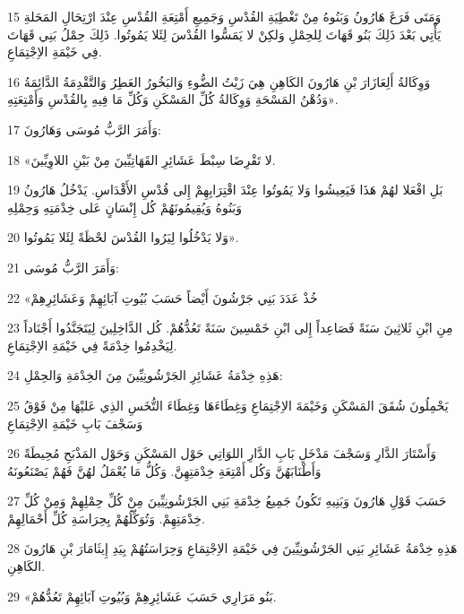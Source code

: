 \par 15 وَمَتَى فَرَغَ هَارُونُ وَبَنُوهُ مِنْ تَغْطِيَةِ القُدْسِ وَجَمِيعِ أَمْتِعَةِ القُدْسِ عِنْدَ ارْتِحَالِ المَحَلةِ يَأْتِي بَعْدَ ذَلِكَ بَنُو قَهَاتَ لِلحِمْلِ وَلكِنْ لا يَمَسُّوا القُدْسَ لِئَلا يَمُوتُوا. ذَلِكَ حِمْلُ بَنِي قَهَاتَ فِي خَيْمَةِ الاِجْتِمَاعِ.
\par 16 وَوِكَالةُ أَلِعَازَارَ بْنِ هَارُونَ الكَاهِنِ هِيَ زَيْتُ الضُّوءِ وَالبَخُورُ العَطِرُ وَالتَّقْدِمَةُ الدَّائِمَةُ وَدُهْنُ المَسْحَةِ وَوِكَالةُ كُلِّ المَسْكَنِ وَكُلِّ مَا فِيهِ بِالقُدْسِ وَأَمْتِعَتِهِ».
\par 17 وَأَمَرَ الرَّبُّ مُوسَى وَهَارُونَ:
\par 18 «لا تَقْرِضَا سِبْطَ عَشَائِرِ القَهَاتِيِّينَ مِنْ بَيْنِ اللاوِيِّينَ.
\par 19 بَلِ افْعَلا لهُمْ هَذَا فَيَعِيشُوا وَلا يَمُوتُوا عِنْدَ اقْتِرَابِهِمْ إِلى قُدْسِ الأَقْدَاسِ. يَدْخُلُ هَارُونُ وَبَنُوهُ وَيُقِيمُونَهُمْ كُل إِنْسَانٍ عَلى خِدْمَتِهِ وَحِمْلِهِ
\par 20 وَلا يَدْخُلُوا لِيَرُوا القُدْسَ لحْظَةً لِئَلا يَمُوتُوا».
\par 21 وَأَمَرَ الرَّبُّ مُوسَى:
\par 22 «خُذْ عَدَدَ بَنِي جَرْشُونَ أَيْضاً حَسَبَ بُيُوتِ آبَائِهِمْ وَعَشَائِرِهِمْ
\par 23 مِنِ ابْنِ ثَلاثِينَ سَنَةً فَصَاعِداً إِلى ابْنِ خَمْسِينَ سَنَةً تَعُدُّهُمْ. كُل الدَّاخِلِينَ لِيَتَجَنَّدُوا أَجْنَاداً لِيَخْدِمُوا خِدْمَةً فِي خَيْمَةِ الاِجْتِمَاعِ.
\par 24 هَذِهِ خِدْمَةُ عَشَائِرِ الجَرْشُونِيِّينَ مِنَ الخِدْمَةِ وَالحِمْلِ:
\par 25 يَحْمِلُونَ شُقَقَ المَسْكَنِ وَخَيْمَةَ الاِجْتِمَاعِ وَغِطَاءَهَا وَغِطَاءَ التُّخَسِ الذِي عَليْهَا مِنْ فَوْقُ وَسَجْفَ بَابِ خَيْمَةِ الاِجْتِمَاعِ
\par 26 وَأَسْتَارَ الدَّارِ وَسَجْفَ مَدْخَلِ بَابِ الدَّارِ اللوَاتِي حَوْل المَسْكَنِ وَحَوْل المَذْبَحِ مُحِيطَةً وَأَطْنَابَهُنَّ وَكُل أَمْتِعَةِ خِدْمَتِهِنَّ. وَكُلُّ مَا يُعْمَلُ لهُنَّ فَهُمْ يَصْنَعُونَهُ
\par 27 حَسَبَ قَوْلِ هَارُونَ وَبَنِيهِ تَكُونُ جَمِيعُ خِدْمَةِ بَنِي الجَرْشُونِيِّينَ مِنْ كُلِّ حِمْلِهِمْ وَمِنْ كُلِّ خِدْمَتِهِمْ. وَتُوَكِّلُهُمْ بِحِرَاسَةِ كُلِّ أَحْمَالِهِمْ.
\par 28 هَذِهِ خِدْمَةُ عَشَائِرِ بَنِي الجَرْشُونِيِّينَ فِي خَيْمَةِ الاِجْتِمَاعِ وَحِرَاسَتُهُمْ بِيَدِ إِيثَامَارَ بْنِ هَارُونَ الكَاهِنِ.
\par 29 «بَنُو مَرَارِي حَسَبَ عَشَائِرِهِمْ وَبُيُوتِ آبَائِهِمْ تَعُدُّهُمْ.
